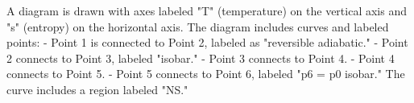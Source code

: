 A diagram is drawn with axes labeled "T" (temperature) on the vertical axis and "s" (entropy) on the horizontal axis. The diagram includes curves and labeled points:  
- Point 1 is connected to Point 2, labeled as "reversible adiabatic."  
- Point 2 connects to Point 3, labeled "isobar."  
- Point 3 connects to Point 4.  
- Point 4 connects to Point 5.  
- Point 5 connects to Point 6, labeled "p6 = p0 isobar."  
The curve includes a region labeled "NS."